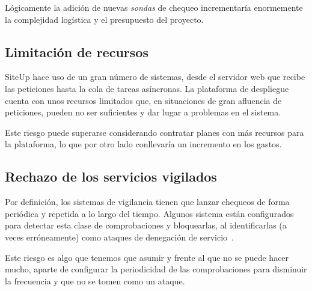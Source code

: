 Lógicamente la adición de nuevas \textit{sondas} de chequeo incrementaría
enormemente la complejidad logística y el presupuesto del proyecto.

\subsection{Limitación de recursos}

SiteUp hace uso de un gran número de sistemas, desde el servidor web que recibe
las peticiones hasta la cola de tareas asíncronas. La plataforma de despliegue
cuenta con unos recursos limitados que, en situaciones de gran afluencia de
peticiones, pueden no ser suficientes y dar lugar a problemas en el
sistema. 

Este riesgo puede superarse considerando contratar planes con más recursos para
la plataforma, lo que por otro lado conllevaría un incremento en los gastos.

\subsection{Rechazo de los servicios vigilados}

Por definición, los sistemas de vigilancia tienen que lanzar chequeos de forma
periódica y repetida a lo largo del tiempo. Algunos sistema están configurados
para detectar esta clase de comprobaciones y bloquearlas, al identificarlas (a
veces erróneamente) como ataques de denegación de servicio~\cite{ddos}. 

Este riesgo es algo que tenemos que asumir y frente al que no se puede hacer
mucho, aparte de configurar la periodicidad de las comprobaciones para
disminuir la frecuencia y que no se tomen como un ataque.



